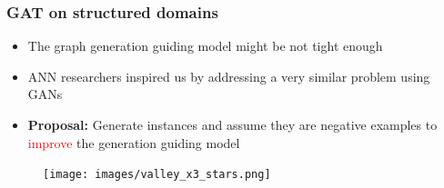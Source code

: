\documentclass{beamer}
\newcommand{\red}[1]{\textcolor{red}{#1}}
\begin{document}
\begin{frame}
\frametitle{GAT on structured domains}
    \begin{itemize}

        \item The graph generation guiding model might be not tight enough
        \item ANN researchers inspired us by addressing  a very similar problem using GANs
        
        \item {\bf Proposal:} Generate instances and assume they are negative examples
            to \red{improve} the generation guiding model
    \end{itemize}
    \begin{figure}[ht]
        \centering
        \texttt{[image: images/valley\_x3\_stars.png]}
    \end{figure}    
\end{frame}

\end{document}
